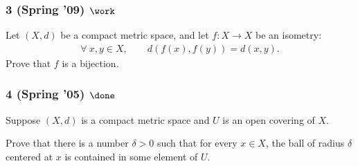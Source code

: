 \hypertarget{spring-09-work}{%
\subsubsection{\texorpdfstring{3 (Spring '09)
\(\work\)}{3 (Spring '09) \textbackslash work}}\label{spring-09-work}}

Let \((X, d)\) be a compact metric space, and let \(f : X \to X\) be an
isometry:
\begin{align*}
\forall~ x, y \in X, \qquad d(f (x), f (y)) = d(x, y)
.\end{align*}
Prove that \(f\) is a bijection.

\hypertarget{spring-05-done}{%
\subsubsection{\texorpdfstring{4 (Spring '05)
\(\done\)}{4 (Spring '05) \textbackslash done}}\label{spring-05-done}}

Suppose \((X, d)\) is a compact metric space and \(U\) is an open
covering of \(X\).

Prove that there is a number \(\delta > 0\) such that for every
\(x \in X\), the ball of radius \(\delta\) centered at \(x\) is
contained in some element of \(U\).

